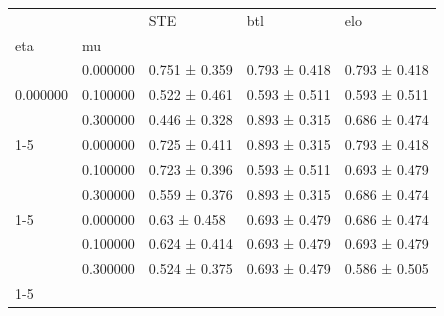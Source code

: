 \begin{tabular}{lllll}
\toprule
 &  & STE & btl & elo \\
eta & mu &  &  &  \\
\midrule
\multirow[t]{3}{*}{0.000000} & 0.000000 & 0.751 ± 0.359 & 0.793 ± 0.418 & 0.793 ± 0.418 \\
 & 0.100000 & 0.522 ± 0.461 & 0.593 ± 0.511 & 0.593 ± 0.511 \\
 & 0.300000 & 0.446 ± 0.328 & 0.893 ± 0.315 & 0.686 ± 0.474 \\
\cline{1-5}
\multirow[t]{3}{*}{0.050000} & 0.000000 & 0.725 ± 0.411 & 0.893 ± 0.315 & 0.793 ± 0.418 \\
 & 0.100000 & 0.723 ± 0.396 & 0.593 ± 0.511 & 0.693 ± 0.479 \\
 & 0.300000 & 0.559 ± 0.376 & 0.893 ± 0.315 & 0.686 ± 0.474 \\
\cline{1-5}
\multirow[t]{3}{*}{0.100000} & 0.000000 & 0.63 ± 0.458 & 0.693 ± 0.479 & 0.686 ± 0.474 \\
 & 0.100000 & 0.624 ± 0.414 & 0.693 ± 0.479 & 0.693 ± 0.479 \\
 & 0.300000 & 0.524 ± 0.375 & 0.693 ± 0.479 & 0.586 ± 0.505 \\
\cline{1-5}
\bottomrule
\end{tabular}
